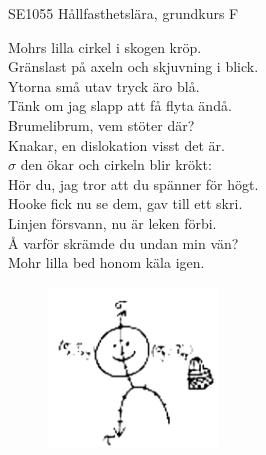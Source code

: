 \documentclass[a6paper,10pt]{article}
\begin{document}
\setlength{\oddsidemargin}{-0.37in}
\noindent
\begin{center}
\footnotesize SE1055 Hållfasthetslära, grundkurs F\\
\end{center}
\begin{lyrics}
Mohrs lilla cirkel i skogen kröp. \\
Gränslast på axeln och skjuvning i blick. \\
Ytorna små utav tryck äro blå. \\
Tänk om jag slapp att få flyta ändå. 
\vspace{5pt} \\
Brumelibrum, vem stöter där? \\
Knakar, en dislokation visst det är. \\
$\sigma$ den ökar och cirkeln blir krökt: \\
Hör du, jag tror att du spänner för högt. 
\vspace{5pt} \\
Hooke fick nu se dem, gav till ett skri. \\
Linjen försvann, nu är leken förbi. \\
Å varför skrämde du undan min vän? \\
Mohr lilla bed honom käla igen. 
\end{lyrics}

\begin{figure}[!h]
\centering
\includegraphics[width=0.4\textwidth]{Hallfgubbe.png}
\end{figure}
\end{document}
